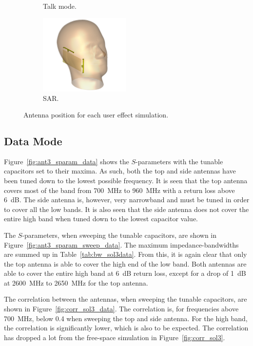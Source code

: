 \begin{figure}[htbp]
\begin{subfigure}[b]{0.24\linewidth}
        \caption{Talk mode.}
    \end{subfigure}
    \begin{subfigure}[b]{0.24\linewidth}
        \centering
        \includegraphics[width=\linewidth,height=4cm,keepaspectratio]{img/tech_sol/nonresonant/simulation/sar/3d}
        \caption{SAR.}
    \end{subfigure}
    \caption{Antenna position for each user effect simulation.}
    \label{fig:ant3_positions}
\end{figure}

\FloatBarrier
\subsection{Data Mode}
Figure~\ref{fig:ant3_sparam_data} shows the $S$-parameters with the tunable capacitors set to their maxima. As such, both the top and side antennas have been tuned down to the lowest possible frequency. It is seen that the top antenna covers most of the band from \SI{700}{MHz} to \SI{960}{MHz} with a return loss above \SI{6}{dB}. The side antenna is, however, very narrowband and must be tuned in order to cover all the low bands. It is also seen that the side antenna does not cover the entire high band when tuned down to the lowest capacitor value. 

The $S$-parameters, when sweeping the tunable capacitors, are shown in Figure~\ref{fig:ant3_sparam_sweep_data}. The maximum impedance-bandwidths are summed up in Table~\ref{tab:bw_sol3data}. From this, it is again clear that only the top antenna is able to cover the high end of the low band. Both antennas are able to cover the entire high band at \SI{6}{dB} return loss, except for a drop of \SI{1}{dB} at \SI{2600}{MHz} to \SI{2650}{MHz} for the top antenna.

The correlation between the antennas, when sweeping the tunable capacitors, are shown in Figure~\ref{fig:corr_sol3_data}. The correlation is, for frequencies above \SI{700}{MHz}, below 0.4 when sweeping the top and side antenna. For the high band, the correlation is significantly lower, which is also to be expected. The correlation has dropped a lot from the free-space simulation in Figure~\ref{fig:corr_sol3}.


